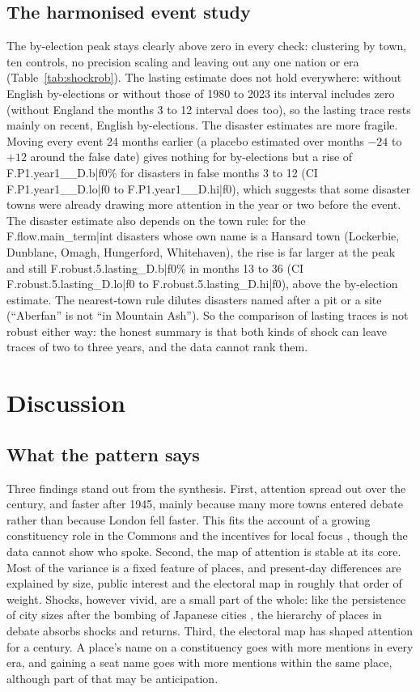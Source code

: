 \documentclass[11pt,a4paper]{article}
\begin{document}
\subsection{The harmonised event study}
The by-election peak stays clearly above zero in every check: clustering by town, ten controls, no precision scaling and leaving out any one nation or era (Table~\ref{tab:shockrob}). The lasting estimate does not hold everywhere: without English by-elections or without those of 1980 to 2023 its interval includes zero (without England the months 3 to 12 interval does too), so the lasting trace rests mainly on recent, English by-elections. The disaster estimates are more fragile. Moving every event 24 months earlier (a placebo estimated over months $-24$ to $+12$ around the false date) gives nothing for by-elections but a rise of {{F.P1.year1__D.b|f0}}\% for disasters in false months 3 to 12 (CI {{F.P1.year1__D.lo|f0}} to {{F.P1.year1__D.hi|f0}}), which suggests that some disaster towns were already drawing more attention in the year or two before the event. The disaster estimate also depends on the town rule: for the {{F.flow.main_term|int}} disasters whose own name is a Hansard town (Lockerbie, Dunblane, Omagh, Hungerford, Whitehaven), the rise is far larger at the peak and still {{F.robust.5.lasting_D.b|f0}}\% in months 13 to 36 (CI {{F.robust.5.lasting_D.lo|f0}} to {{F.robust.5.lasting_D.hi|f0}}), above the by-election estimate. The nearest-town rule dilutes disasters named after a pit or a site (``Aberfan'' is not ``in Mountain Ash''). So the comparison of lasting traces is not robust either way: the honest summary is that both kinds of shock can leave traces of two to three years, and the data cannot rank them.

\section{Discussion}\label{sec:disc}
\subsection{What the pattern says}
Three findings stand out from the synthesis. First, attention spread out over the century, and faster after 1945, mainly because many more towns entered debate rather than because London fell faster. This fits the account of a growing constituency role in the Commons \citep{norton1994,nortonwood1993} and the incentives for local focus \citep{cain1987}, though the data cannot show who spoke. Second, the map of attention is stable at its core. Most of the variance is a fixed feature of places, and present-day differences are explained by size, public interest and the electoral map in roughly that order of weight. Shocks, however vivid, are a small part of the whole: like the persistence of city sizes after the bombing of Japanese cities \citep{davis2002}, the hierarchy of places in debate absorbs shocks and returns. Third, the electoral map has shaped attention for a century. A place's name on a constituency goes with more mentions in every era, and gaining a seat name goes with more mentions within the same place, although part of that may be anticipation.
\end{document}
